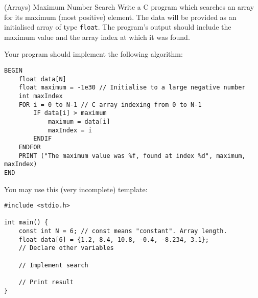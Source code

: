 \documentclass{lab}
\begin{document}
\begin{task}{(Arrays) Maximum Number Search}{}
Write a C program which searches an array for its maximum (most positive) element. The data will be provided as an initialised array of type \texttt{float}. The program's output should include the maximum value and the array index at which it was found.

Your program should implement the following algorithm:

\begin{lstlisting}[style=pseudo]
BEGIN
	float data[N]
	float maximum = -1e30 // Initialise to a large negative number
	int maxIndex
	FOR i = 0 to N-1 // C array indexing from 0 to N-1
		IF data[i] > maximum
			maximum = data[i]
			maxIndex = i
		ENDIF
	ENDFOR
	PRINT ("The maximum value was %f, found at index %d", maximum, maxIndex)
END
\end{lstlisting}

You may use this (very incomplete) template:

\begin{lstlisting}[style=Ctable]
#include <stdio.h>

int main() {
	const int N = 6; // const means "constant". Array length.
	float data[6] = {1.2, 8.4, 10.8, -0.4, -8.234, 3.1};
	// Declare other variables
	
	// Implement search
	
	// Print result
}
\end{lstlisting}

\end{task}
\end{document}
